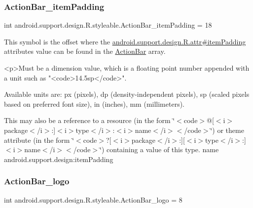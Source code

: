 \subsubsection{\texorpdfstring{Action\+Bar\+\_\+item\+Padding}{ActionBar\_itemPadding}}
{\footnotesize\ttfamily int android.\+support.\+design.\+R.\+styleable.\+Action\+Bar\+\_\+item\+Padding = 18\hspace{0.3cm}{\ttfamily [static]}}

This symbol is the offset where the \hyperlink{classandroid_1_1support_1_1design_1_1R_1_1attr_af0fdea6a270ce35a04d199699e87cacb}{android.\+support.\+design.\+R.\+attr\#item\+Padding} attribute\textquotesingle{}s value can be found in the \hyperlink{classandroid_1_1support_1_1design_1_1R_1_1styleable_ab795220a96557d11f8c21359b95bed82}{Action\+Bar} array.

\begin{DoxyVerb}      <p>Must be a dimension value, which is a floating point number appended with a unit such as "<code>14.5sp</code>".
\end{DoxyVerb}
 Available units are\+: px (pixels), dp (density-\/independent pixels), sp (scaled pixels based on preferred font size), in (inches), mm (millimeters). 

This may also be a reference to a resource (in the form \char`\"{}$<$code$>$@\mbox{[}$<$i$>$package$<$/i$>$\+:\mbox{]}$<$i$>$type$<$/i$>$\+:$<$i$>$name$<$/i$>$$<$/code$>$\char`\"{}) or theme attribute (in the form \char`\"{}$<$code$>$?\mbox{[}$<$i$>$package$<$/i$>$\+:\mbox{]}\mbox{[}$<$i$>$type$<$/i$>$\+:\mbox{]}$<$i$>$name$<$/i$>$$<$/code$>$\char`\"{}) containing a value of this type.  name android.\+support.\+design\+:item\+Padding \mbox{\label{classandroid_1_1support_1_1design_1_1R_1_1styleable_a2e3a0d864b97ab7733b49ad177a6e546}} 
\subsubsection{\texorpdfstring{Action\+Bar\+\_\+logo}{ActionBar\_logo}}
{\footnotesize\ttfamily int android.\+support.\+design.\+R.\+styleable.\+Action\+Bar\+\_\+logo = 8\hspace{0.3cm}{\ttfamily [static]}}

